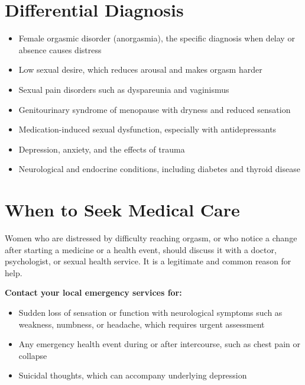 \section*{Differential Diagnosis}
\begin{itemize}
    \item Female orgasmic disorder (anorgasmia), the specific diagnosis when delay or absence causes distress
    \item Low sexual desire, which reduces arousal and makes orgasm harder
    \item Sexual pain disorders such as dyspareunia and vaginismus
    \item Genitourinary syndrome of menopause with dryness and reduced sensation
    \item Medication-induced sexual dysfunction, especially with antidepressants
    \item Depression, anxiety, and the effects of trauma
    \item Neurological and endocrine conditions, including diabetes and thyroid disease
\end{itemize}

\section*{When to Seek Medical Care}
Women who are distressed by difficulty reaching orgasm, or who notice a change after starting a medicine or a health event, should discuss it with a doctor, psychologist, or sexual health service. It is a legitimate and common reason for help.

\textbf{Contact your local emergency services for:}
\begin{itemize}
    \item Sudden loss of sensation or function with neurological symptoms such as weakness, numbness, or headache, which requires urgent assessment
    \item Any emergency health event during or after intercourse, such as chest pain or collapse
    \item Suicidal thoughts, which can accompany underlying depression
\end{itemize}

